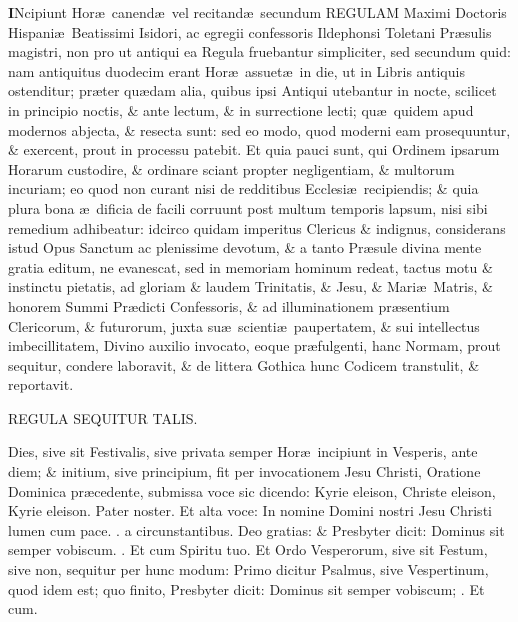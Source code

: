 \documentclass[letter,11pt]{book}
\makeatletter
\DeclareRobustCommand{\Rbar}{\vers@resp{0pt}{R}}
\newcommand{\vers@resp@sym}{\raisebox{0.2ex}{\rotatebox[origin=c]{-20}{$\m@th\rceil$}}}
\newcommand{\vers@resp}[2]{%
  {\ooalign{\hidewidth\kern#1\vers@resp@sym\hidewidth\cr#2\cr}}%
}%
\def\R{\color{Red} \Rbar . \color{black}}
\makeatother
\begin{document}
\begin{multicols}{2} \color{Red}
\lettrine[lines=2]{\bfseries \color{black} I}{}Ncipiunt Hor\ae \ canend\ae \ vel recitand\ae \ secundum REGULAM Maximi Doctoris Hispani\ae \ Beatissimi Isidori, ac egregii confessoris Ildephonsi Toletani Pr\ae sulis magistri, non pro ut antiqui ea Regula fruebantur simpliciter, sed secundum quid: nam antiquitus duodecim erant Hor\ae \ assuet\ae \ in die, ut in Libris antiquis ostenditur; pr\ae ter qu\ae dam alia, quibus ipsi Antiqui utebantur in nocte, scilicet in principio noctis, \& ante lectum, \& in surrectione lecti; qu\ae \ quidem apud modernos abjecta, \& resecta sunt: sed eo modo, quod moderni eam prosequuntur, \& exercent, prout in processu patebit.
Et quia pauci sunt, qui Ordinem ipsarum Horarum custodire, \& ordinare sciant propter negligentiam, \& multorum incuriam; eo quod non curant nisi de redditibus Ecclesi\ae \ recipiendis; \& quia plura bona \ae \ dificia de facili corruunt post multum temporis lapsum, nisi sibi remedium adhibeatur: idcirco quidam imperitus Clericus \& indignus, considerans istud Opus Sanctum ac plenissime devotum, \& a tanto Pr\ae sule divina mente gratia editum, ne evanescat, sed in memoriam hominum redeat, tactus motu \& instinctu pietatis, ad gloriam \& laudem Trinitatis, \& Jesu, \& Mari\ae \ Matris, \& honorem Summi Pr\ae dicti Confessoris, \& ad illuminationem pr\ae sentium Clericorum, \& futurorum, juxta su\ae \ scienti\ae \ paupertatem, \& sui intellectus imbecillitatem, Divino auxilio invocato, eoque pr\ae fulgenti, hanc Normam, prout sequitur, condere laboravit, \& de littera Gothica hunc Codicem transtulit, \& reportavit.
\begin{center} \large \color{black}
REGULA SEQUITUR TALIS.
\end{center}
\par Dies, sive sit Festivalis, sive privata semper Hor\ae \ incipiunt in Vesperis, ante diem; \& initium, sive principium, fit per invocationem Jesu Christi, Oratione Dominica pr\ae cedente, submissa voce sic dicendo: \color{black} Kyrie eleison, Christe eleison, Kyrie eleison. Pater noster. \color{Red}
Et alta voce: \color{black} In nomine Domini nostri Jesu Christi lumen cum pace. \R \color{Red} a circunstantibus. \color{black} Deo gratias: \color{Red} \& Presbyter dicit: \color{black} Dominus sit semper vobiscum. \R Et cum Spiritu tuo. \color{Red} Et Ordo Vesperorum, sive sit Festum, sive non, sequitur per hunc modum: Primo dicitur Psalmus, sive Vespertinum, quod idem est; quo finito, Presbyter dicit: \color{black} Dominus sit semper vobiscum; \R Et cum. \color{Red}

\end{multicols}
\end{document}
